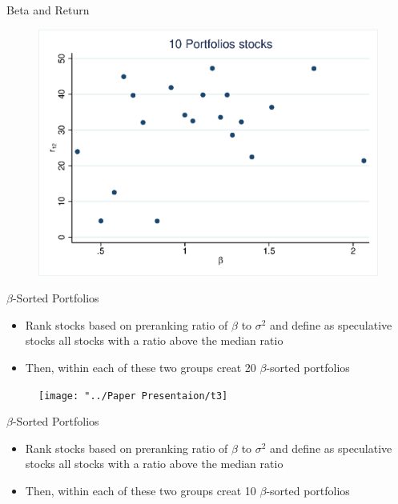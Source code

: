 \documentclass{beamer}
\begin{document}
\begin{frame}{Beta and Return}
	\begin{figure}
		\centering
		\includegraphics[width=0.7\linewidth]{10portfo.eps}
		\label{fig:betareturn}
	\end{figure}
	
\end{frame}


\begin{frame}{$ \beta $-Sorted Portfolios}
	\begin{itemize}
		\item Rank stocks based on preranking ratio of $ \beta $ to $ \sigma^2 $ and define as speculative stocks all stocks with a ratio above  the  median ratio
		\item Then, within each of these two groups creat 20 $ \beta $-sorted portfolios
	\end{itemize}
	\begin{figure}
		\centering
		\texttt{[image: "../Paper Presentaion/t3]}
	\end{figure}
\end{frame}

\begin{frame}{$ \beta $-Sorted Portfolios}
	\begin{itemize}
		\item Rank stocks based on preranking ratio of $ \beta $ to $ \sigma^2 $ and define as speculative stocks all stocks with a ratio above  the  median ratio
		\item Then, within each of these two groups creat 10 $ \beta $-sorted portfolios
	\end{itemize}
	

			\begin{table}[htbp]
			\centering
			\resizebox{0.7\textwidth}{!}{
				
				\label{tab:addlabel2}	
			}
		\end{table}
		  
\end{frame}
\end{document}
